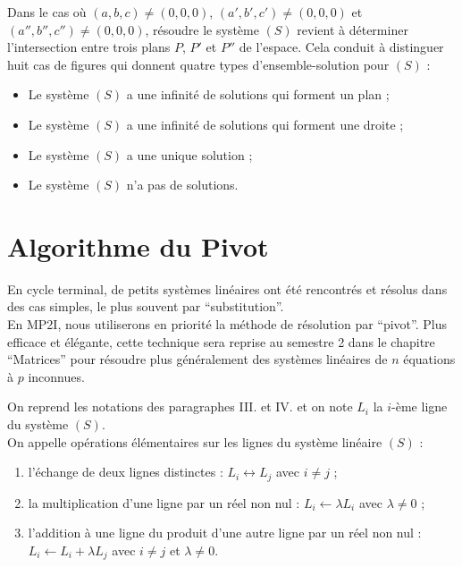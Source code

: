 \begin{defprop}
	Dans le cas où \((a,b,c)\neq (0,0,0)\), \((a',b',c')\neq (0,0,0)\) et \((a'',b'',c'')\neq (0,0,0)\), résoudre le système \((S)\) revient à déterminer l’intersection entre trois plans \(P\), \(P'\) et \(P''\) de l’espace.
	Cela conduit à distinguer huit cas de figures qui donnent quatre types d’ensemble-solution pour \((S)\) :
	\begin{itemize}
		\item Le système \((S)\) a une infinité de solutions qui forment un plan ;
		\item Le système \((S)\) a une infinité de solutions qui forment une droite ;
		\item Le système \((S)\) a une unique solution ;
		\item Le système \((S)\) n’a pas de solutions.
	\end{itemize}
\end{defprop}

\section{Algorithme du Pivot}
\begin{rem} 
	En cycle terminal, de petits systèmes linéaires ont été rencontrés et résolus dans des cas simples, le plus souvent par “substitution”. \\
	En MP2I, nous utiliserons en priorité la méthode de résolution par “pivot”. Plus efficace et élégante, cette technique sera reprise au semestre 2 dans le chapitre “Matrices” pour résoudre plus généralement des systèmes linéaires de \(n\) équations à \(p\) inconnues.
\end{rem}

\begin{defprop}
	On reprend les notations des paragraphes III. et IV. et on note \(L_i\) la \(i\)-ème ligne du système \((S)\).\\
	On appelle opérations élémentaires sur les lignes du système linéaire \((S)\) :
	\begin{enumerate}
		\item l’échange de deux lignes distinctes : \(L_i \leftrightarrow L_j\) avec \(i\neq j\) ;
		\item la multiplication d'une ligne par un réel non nul : \(L_i \leftarrow \lambda L_i\) avec \(\lambda\neq 0\) ;
		\item l'addition à une ligne du produit d'une autre ligne par un réel non nul : \(L_i \leftarrow L_i + \lambda L_j\) avec \(i\neq j\) et \(\lambda\neq 0\).
	\end{enumerate}
\end{defprop}

